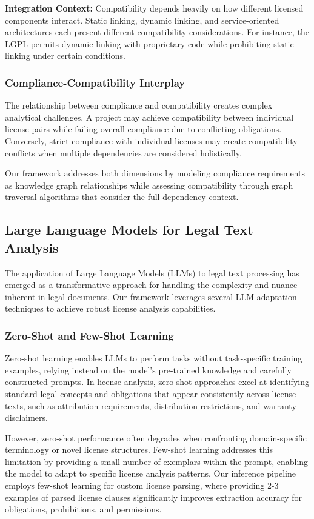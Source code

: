 \documentclass[9pt,twocolumn]{article}
\begin{document}
\textbf{Integration Context:} Compatibility depends heavily on how different licensed components interact. Static linking, dynamic linking, and service-oriented architectures each present different compatibility considerations. For instance, the LGPL permits dynamic linking with proprietary code while prohibiting static linking under certain conditions.

\subsubsection{Compliance-Compatibility Interplay}
The relationship between compliance and compatibility creates complex analytical challenges. A project may achieve compatibility between individual license pairs while failing overall compliance due to conflicting obligations. Conversely, strict compliance with individual licenses may create compatibility conflicts when multiple dependencies are considered holistically.

Our framework addresses both dimensions by modeling compliance requirements as knowledge graph relationships while assessing compatibility through graph traversal algorithms that consider the full dependency context.

\subsection{Large Language Models for Legal Text Analysis}

The application of Large Language Models (LLMs) to legal text processing has emerged as a transformative approach for handling the complexity and nuance inherent in legal documents. Our framework leverages several LLM adaptation techniques to achieve robust license analysis capabilities.

\subsubsection{Zero-Shot and Few-Shot Learning}
Zero-shot learning enables LLMs to perform tasks without task-specific training examples, relying instead on the model's pre-trained knowledge and carefully constructed prompts. In license analysis, zero-shot approaches excel at identifying standard legal concepts and obligations that appear consistently across license texts, such as attribution requirements, distribution restrictions, and warranty disclaimers.

However, zero-shot performance often degrades when confronting domain-specific terminology or novel license structures. Few-shot learning addresses this limitation by providing a small number of exemplars within the prompt, enabling the model to adapt to specific license analysis patterns. Our inference pipeline employs few-shot learning for custom license parsing, where providing 2-3 examples of parsed license clauses significantly improves extraction accuracy for obligations, prohibitions, and permissions.
\end{document}
